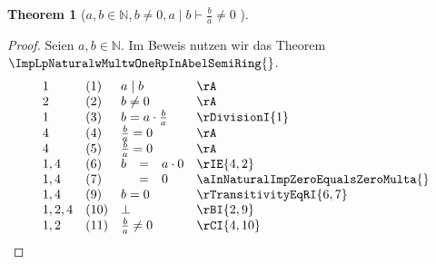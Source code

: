 \documentclass{book}
\theoremstyle{plain}
\newtheorem{theorem}{Theorem}
\theoremstyle{remark}
\theoremstyle{definition}
\begin{document}
\label{awbInNaturalwbNotEqualsZerowaMidbImpLpbRpDurchLpaRpNotEqualsZero}
\begin{theorem}[\(a,b \in\mathbb{N}, b\neq 0, a\mid b\vdash \frac{b}{a}\neq 0\) ]
\end{theorem}
\begin{proof}
Seien \(a,b\in\mathbb{N}\).
Im Beweis nutzen wir das Theorem \(\ImpLpNaturalwMultwOneRpInAbelSemiRing{}\). 
    \[
    \begin{array}{llclll}
    1       &  (1)  & \multicolumn{3}{l}{a\mid b} & \rA \\
    2       &  (2)  & \multicolumn{3}{l}{b\neq 0} & \rA \\
    1       &  (3)  & \multicolumn{3}{l}{b=a\cdot \frac{b}{a}} & \rDivisionI{1} \\
    4       &  (4)  & \multicolumn{3}{l}{\frac{b}{a}=0} & \rA \\
    4       &  (5)  & \multicolumn{3}{l}{\frac{b}{a}=0} & \rA \\
    1,4     &  (6)  & b&=&a\cdot 0 & \rIE{4,2} \\
    1,4     &  (7)  &  &=&0 & \aInNaturalImpZeroEqualsZeroMulta{} \\
    1,4     &  (9)  & \multicolumn{3}{l}{b=0} & \rTransitivityEqRI{6,7} \\
    1,2,4   &  (10)  & \multicolumn{3}{l}{\bot} & \rBI{2,9} \\
    1,2   &  (11)  & \multicolumn{3}{l}{\frac{b}{a}\neq 0} & \rCI{4,10} \\
    \end{array}
    \]
\end{proof}
\end{document}
